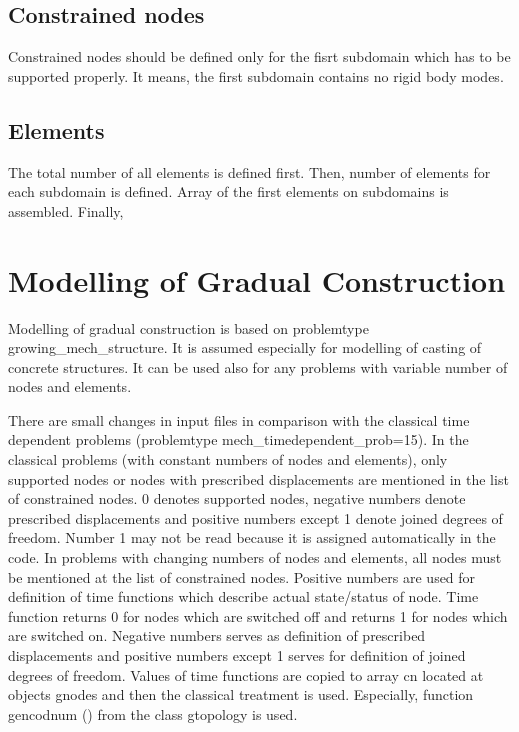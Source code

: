 \subsection{Constrained nodes}

Constrained nodes should be defined only for the fisrt subdomain which has to be supported properly.
It means, the first subdomain contains no rigid body modes.

\subsection{Elements}

The total number of all elements is defined first. 
Then, number of elements for each subdomain is defined. Array of the first elements on
subdomains is assembled. Finally, 

\section{Modelling of Gradual Construction}

Modelling of gradual construction is based on {\sf problemtype} growing\_mech\_structure.
It is assumed especially for modelling of casting of concrete structures. It can be used
also for any problems with variable number of nodes and elements.

There are small changes in input files in comparison with the classical time dependent
problems ({\sf problemtype} mech\_timedependent\_prob=15).
In the classical problems (with constant numbers of nodes
and elements), only supported nodes or nodes with prescribed displacements are mentioned
in the list of constrained nodes. 0 denotes supported nodes, negative numbers denote
prescribed displacements and positive numbers except 1 denote joined degrees of freedom.
Number 1 may not be read because it is assigned automatically in the code. In problems
with changing numbers of nodes and elements, all nodes must be mentioned at the list of
constrained nodes. Positive numbers are used for definition of time functions which
describe actual state/status of node. Time function returns 0 for nodes which are
switched off and returns 1 for nodes which are switched on. Negative numbers serves
as definition of prescribed displacements and positive numbers except 1 serves for
definition of joined degrees of freedom.
Values of time functions are copied to array cn located at objects gnodes and then the
classical treatment is used. Especially, function gencodnum () from the class gtopology
is used.


